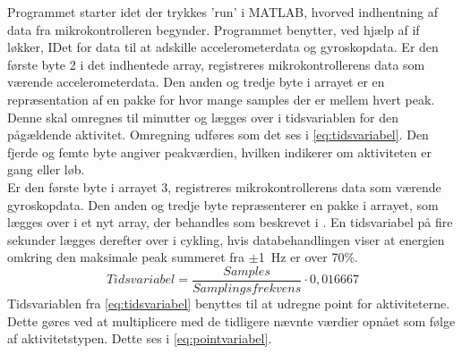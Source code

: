 Programmet starter idet der trykkes 'run' i MATLAB, hvorved indhentning af data fra mikrokontrolleren begynder. Programmet benytter, ved hjælp af if løkker, IDet for data til at adskille accelerometerdata og gyroskopdata. Er den første byte 2 i det indhentede array, registreres mikrokontrollerens data som værende accelerometerdata. Den anden og tredje byte i arrayet er en repræsentation af en pakke for hvor mange samples der er mellem hvert peak. Denne skal omregnes til minutter og lægges over i tidsvariablen for den pågældende aktivitet. Omregning udføres som det ses i \eqref{eq:tidsvariabel}. Den fjerde og femte byte angiver peakværdien, hvilken indikerer om aktiviteten er gang eller løb. \\
Er den første byte i arrayet 3, registreres mikrokontrollerens data som værende gyroskopdata. Den anden og tredje byte repræsenterer en pakke i arrayet, som lægges over i et nyt array, der behandles som beskrevet i . En tidsvariabel på fire sekunder lægges derefter over i cykling, hvis databehandlingen viser at energien omkring den maksimale peak summeret fra $\pm$1~Hz er over 70\%.  
\begin{equation}
Tidsvariabel = \frac{Samples}{Samplingsfrekvens} \cdot 0,016667
\label{eq:tidsvariabel}
\end{equation}
Tidsvariablen fra \eqref{eq:tidsvariabel} benyttes til at udregne point for aktiviteterne. Dette gøres ved at multiplicere med de tidligere nævnte værdier opnået som følge af aktivitetstypen. Dette ses i \eqref{eq:pointvariabel}. 
